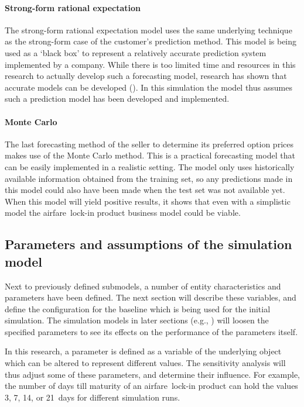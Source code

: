 \paragraph{Strong-form rational expectation}
The strong-form rational expectation model uses the same underlying technique as the strong-form case of the customer's prediction method. This model is being used as a `black box' to represent a relatively accurate prediction system implemented by a company. While there is too limited time and resources in this research to actually develop such a forecasting model, research has shown that accurate models can be developed (). In this simulation the model thus assumes such a prediction model has been developed and implemented.

\paragraph{Monte Carlo}
The last forecasting method of the seller to determine its preferred option prices makes use of the Monte Carlo method. This is a practical forecasting model that can be easily implemented in a realistic setting. The model only uses historically available information obtained from the training set, so any predictions made in this model could also have been made when the test set was not available yet. When this model will yield positive results, it shows that even with a simplistic model the airfare~lock-in product business model could be viable.



\subsection{Parameters and assumptions of the simulation model}
Next to previously defined submodels, a number of entity characteristics and parameters have been defined. The next section will describe these variables, and define the configuration for the baseline which is being used for the initial simulation. The simulation models in later sections (e.g., ) will loosen the specified parameters to see its effects on the performance of the parameters itself.

In this research, a parameter is defined as a variable of the underlying object which can be altered to represent different values. The sensitivity analysis will thus adjust some of these parameters, and determine their influence. For example, the number of days till maturity of an airfare~lock-in product can hold the values 3, 7, 14, or 21~days for different simulation runs.


